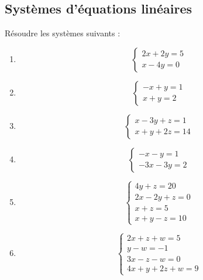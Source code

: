 \vspace{2em}
\subsection{Systèmes d'équations linéaires}
Résoudre les systèmes suivants :

\begin{multicols}{3}
\begin{enumerate}[label={}]
\item 
$$\begin{cases}
  2x + 2y = 5 \\
    x - 4y = 0
  \end{cases}$$

\item 
  $$\begin{cases}
    -x + y = 1 \\
    x + y = 2
  \end{cases}$$

\item 
$$\begin{cases}
    x - 3y + z = 1 \\
    x + y + 2z = 14
  \end{cases}$$


\item 
$$\begin{cases}
    -x - y = 1 \\
    -3x - 3y = 2
  \end{cases}$$


\item 
$$\begin{cases}
    4y + z = 20 \\
    2x - 2y + z = 0 \\
    x + z = 5 \\
    x + y - z = 10
  \end{cases}$$


\item 
$$\begin{cases}
    2x + z + w = 5 \\
    y - w = -1 \\
    3x - z - w = 0 \\
    4x + y + 2z + w = 9
  \end{cases}$$

\end{enumerate}
\end{multicols}

\vspace{2em}

